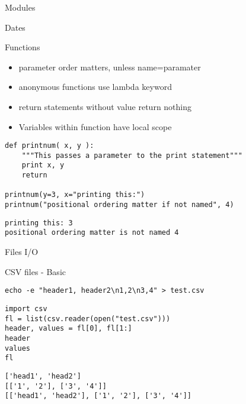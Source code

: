 \documentclass[presentation]{beamer}
\begin{document}
\begin{frame}[label=sec-4-1-18]{Modules}
\end{frame}

\begin{frame}[label=sec-4-1-19]{Dates}
\end{frame}

\begin{frame}[fragile,label=sec-4-1-20]{Functions}
 \begin{itemize}
\item parameter order matters, unless name=paramater
\item anonymous functions use lambda keyword
\item return statements without value return nothing
\item Variables within function have local scope
\end{itemize}

\lstset{numbers=left,language=Python,label= ,caption= }
\begin{lstlisting}
def printnum( x, y ):
    """This passes a parameter to the print statement"""
    print x, y
    return

printnum(y=3, x="printing this:")
printnum("positional ordering matter if not named", 4)
\end{lstlisting}

\lstset{numbers=left,language=Python,label= ,caption= }
\begin{lstlisting}
printing this: 3
positional ordering matter is not named 4
\end{lstlisting}
\end{frame}


\begin{frame}[label=sec-4-1-21]{Files I/O}
\end{frame}

\begin{frame}[fragile,label=sec-4-1-22]{CSV files - Basic}
 \lstset{numbers=left,language=sh,label= ,caption= }
\begin{lstlisting}
echo -e "header1, header2\n1,2\n3,4" > test.csv
\end{lstlisting}
\lstset{numbers=left,language=Python,label= ,caption= }
\begin{lstlisting}
import csv
fl = list(csv.reader(open("test.csv")))
header, values = fl[0], fl[1:]
header
values
fl
\end{lstlisting}

\lstset{numbers=left,language=Python,label= ,caption= }
\begin{lstlisting}
['head1', 'head2']
[['1', '2'], ['3', '4']]
[['head1', 'head2'], ['1', '2'], ['3', '4']]
\end{lstlisting}
\end{frame}
\end{document}
